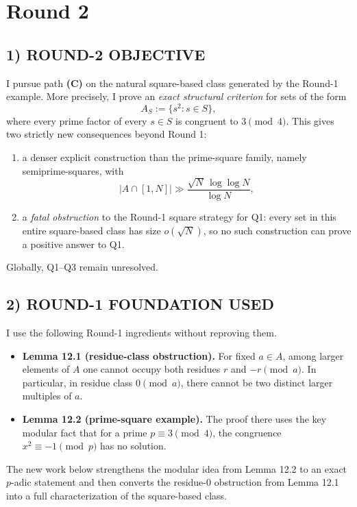 \section{Round 2}

\subsection*{1) ROUND-2 OBJECTIVE}

I pursue path \textbf{(C)} on the natural square-based class generated by the Round-1 example.
More precisely, I prove an \emph{exact structural criterion} for sets of the form
\[
A_S:=\{s^2:s\in S\},
\]
where every prime factor of every $s\in S$ is congruent to $3\pmod 4$.
This gives two strictly new consequences beyond Round 1:
\begin{enumerate}
\item a denser explicit construction than the prime-square family, namely semiprime-squares, with
\[
|A\cap[1,N]|\gg \frac{\sqrt N\,\log\log N}{\log N},
\]
\item a \emph{fatal obstruction} to the Round-1 square strategy for Q1: every set in this entire square-based class has size $o(\sqrt N)$, so no such construction can prove a positive answer to Q1.
\end{enumerate}
Globally, Q1--Q3 remain unresolved.

\subsection*{2) ROUND-1 FOUNDATION USED}

I use the following Round-1 ingredients without reproving them.
\begin{itemize}
\item \textbf{Lemma 12.1 (residue-class obstruction).} For fixed $a\in A$, among larger elements of $A$ one cannot occupy both residues $r$ and $-r\pmod a$. In particular, in residue class $0\pmod a$, there cannot be two distinct larger multiples of $a$.
\item \textbf{Lemma 12.2 (prime-square example).} The proof there uses the key modular fact that for a prime $p\equiv 3\pmod 4$, the congruence $x^2\equiv -1\pmod p$ has no solution.
\end{itemize}
The new work below strengthens the modular idea from Lemma 12.2 to an exact $p$-adic statement and then converts the residue-$0$ obstruction from Lemma 12.1 into a full characterization of the square-based class.

